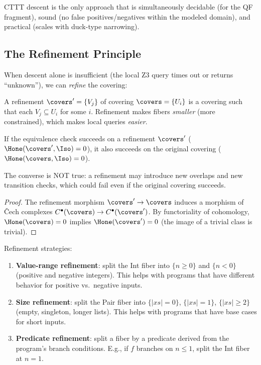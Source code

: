 CTTT descent is the only approach that is simultaneously decidable
(for the QF fragment), sound (no false positives/negatives within
the modeled domain), and practical (scales with duck-type narrowing).

\subsection{The Refinement Principle}

When descent alone is insufficient (the local Z3 query times out or
returns ``unknown''), we can \emph{refine} the covering:

\begin{definition}
A refinement $\covers' = \{V_j\}$ of covering $\covers = \{U_i\}$
is a covering such that each $V_j \subseteq U_i$ for some $i$.
Refinement makes fibers \emph{smaller} (more constrained), which
makes local queries \emph{easier}.
\end{definition}

\begin{theorem}
\label{thm:refinement}
If the equivalence check succeeds on a refinement $\covers'$
($\Hone(\covers', \Iso) = 0$), it also succeeds on the original
covering ($\Hone(\covers, \Iso) = 0$).

The converse is NOT true: a refinement may introduce new overlaps
and new transition checks, which could fail even if the original
covering succeeds.
\end{theorem}

\begin{proof}
The refinement morphism $\covers' \to \covers$ induces a morphism
of \v{C}ech complexes $C^\bullet(\covers) \to C^\bullet(\covers')$.
By functoriality of cohomology, $\Hone(\covers) = 0$ implies
$\Hone(\covers') = 0$ (the image of a trivial class is trivial).
\end{proof}

Refinement strategies:
\begin{enumerate}
  \item \textbf{Value-range refinement}: split the Int fiber into
    $\{n \geq 0\}$ and $\{n < 0\}$ (positive and negative integers).
    This helps with programs that have different behavior for positive
    vs.\ negative inputs.
  \item \textbf{Size refinement}: split the Pair fiber into
    $\{|xs| = 0\}$, $\{|xs| = 1\}$, $\{|xs| \geq 2\}$ (empty,
    singleton, longer lists).  This helps with programs that have
    base cases for short inputs.
  \item \textbf{Predicate refinement}: split a fiber by a predicate
    derived from the program's branch conditions.  E.g., if $f$
    branches on $n \leq 1$, split the Int fiber at $n = 1$.
\end{enumerate}

